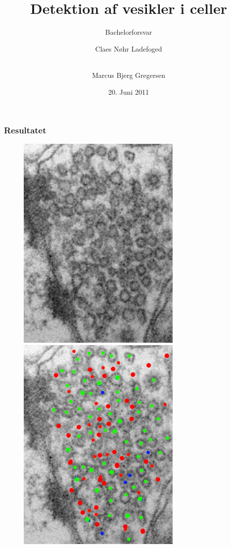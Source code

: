 \documentclass[12pt,t]{beamer}
\title{Detektion af vesikler i celler}
\subtitle{Bachelorforsvar}
\author{Claes Nøhr Ladefoged \and \\
Marcus Bjerg Gregersen}
\institute{Datalogisk Institut}
\date[]{20. Juni 2011}
\begin{document}
\frame[plain]{\titlepage}
\begin{frame}
\frametitle{Resultatet}
\begin{figure}[H]
	\begin{minipage}[b]{0.49\linewidth}
		\includegraphics[scale=0.4]{img/ves/0.jpg}
	\end{minipage}
	\begin{minipage}[b]{0.49\linewidth}
		\includegraphics[scale=0.4]{img/ves/1_2_3.png}
	\end{minipage}
\end{figure}
\end{frame}
\end{document}
